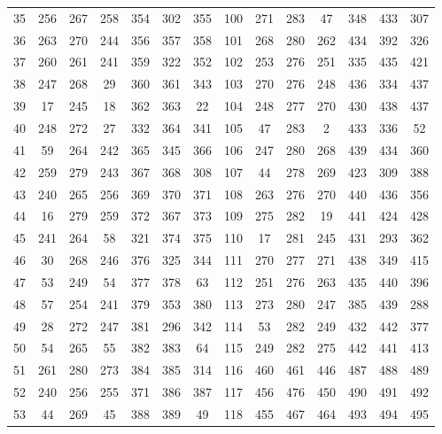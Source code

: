 \begin{apendicesenv}
\begin{table}[H]
\begin{tabular}{@{}ccccccc@{\hspace{1.0cm}}ccccccc@{}}
		35 &  256 &  267 &  258 &  354 &  302 &  355 & 100 &  271 &  283 &   47 &  348 &  433 &  307 \\
		36 &  263 &  270 &  244 &  356 &  357 &  358 & 101 &  268 &  280 &  262 &  434 &  392 &  326 \\
		37 &  260 &  261 &  241 &  359 &  322 &  352 & 102 &  253 &  276 &  251 &  335 &  435 &  421 \\
		38 &  247 &  268 &   29 &  360 &  361 &  343 & 103 &  270 &  276 &  248 &  436 &  334 &  437 \\
		39 &   17 &  245 &   18 &  362 &  363 &   22 & 104 &  248 &  277 &  270 &  430 &  438 &  437 \\
		40 &  248 &  272 &   27 &  332 &  364 &  341 & 105 &   47 &  283 &    2 &  433 &  336 &   52 \\
		41 &   59 &  264 &  242 &  365 &  345 &  366 & 106 &  247 &  280 &  268 &  439 &  434 &  360 \\
		42 &  259 &  279 &  243 &  367 &  368 &  308 & 107 &   44 &  278 &  269 &  423 &  309 &  388 \\
		43 &  240 &  265 &  256 &  369 &  370 &  371 & 108 &  263 &  276 &  270 &  440 &  436 &  356 \\
		44 &   16 &  279 &  259 &  372 &  367 &  373 & 109 &  275 &  282 &   19 &  441 &  424 &  428 \\
		45 &  241 &  264 &   58 &  321 &  374 &  375 & 110 &   17 &  281 &  245 &  431 &  293 &  362 \\
		46 &   30 &  268 &  246 &  376 &  325 &  344 & 111 &  270 &  277 &  271 &  438 &  349 &  415 \\
		47 &   53 &  249 &   54 &  377 &  378 &   63 & 112 &  251 &  276 &  263 &  435 &  440 &  396 \\
		48 &   57 &  254 &  241 &  379 &  353 &  380 & 113 &  273 &  280 &  247 &  385 &  439 &  288 \\
		49 &   28 &  272 &  247 &  381 &  296 &  342 & 114 &   53 &  282 &  249 &  432 &  442 &  377 \\
		50 &   54 &  265 &   55 &  382 &  383 &   64 & 115 &  249 &  282 &  275 &  442 &  441 &  413 \\
		51 &  261 &  280 &  273 &  384 &  385 &  314 & 116 &  460 &  461 &  446 &  487 &  488 &  489 \\
		52 &  240 &  256 &  255 &  371 &  386 &  387 & 117 &  456 &  476 &  450 &  490 &  491 &  492 \\
		53 &   44 &  269 &   45 &  388 &  389 &   49 & 118 &  455 &  467 &  464 &  493 &  494 &  495 \\

\end{tabular}
\end{table}
\end{apendicesenv}
